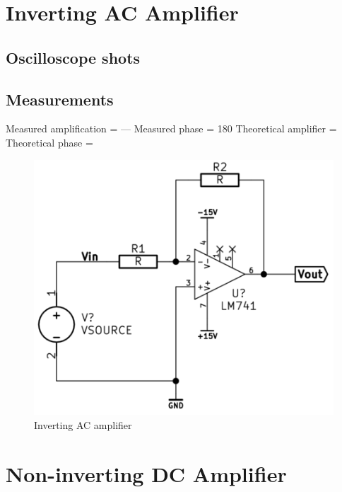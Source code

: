 \documentclass[]{article}
\begin{document}
\section{Inverting AC Amplifier}\label{inverting-ac-amplifier}

\subsection{Oscilloscope shots}\label{oscilloscope-shots}

\subsection{Measurements}\label{measurements-1}

Measured amplification = --- Measured phase = 180 Theoretical amplifier
=\\Theoretical phase =

\begin{figure}[htbp]
\centering
\includegraphics[scale=0.5]{img/invACamp.png}
\caption{Inverting AC amplifier}
\end{figure}

\section{Non-inverting DC Amplifier}\label{non-inverting-dc-amplifier}
\end{document}
